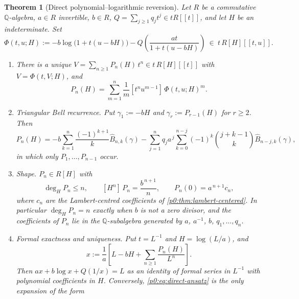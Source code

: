 \documentclass[11pt,a4paper,oneside]{book}
\theoremstyle{plain}
\newtheorem{theorem}{Theorem}[chapter]
\theoremstyle{definition}
\theoremstyle{remark}
\newcommand{\Rat}{\mathbb{Q}}
\newcommand{\Coef}[1]{[#1]\,}
\newcommand{\OB}{\widehat{B}}
\begin{document}
\begin{theorem}[Direct polynomial--logarithmic reversion]\label{p0:thm:flattening}
Let $R$ be a commutative $\Rat$-algebra, $a\in R$ invertible, $b\in R$,
$Q=\sum_{j\ge1}q_jt^j\in tR[[t]]$, and let $H$ be an indeterminate.  Set
\begin{equation}\label{p0:eq:Phi-direct}
 \Phi(t,u;H):=-b\log\bigl(1+t(u-bH)\bigr)
   -Q\!\left(\frac{at}{1+t(u-bH)}\right)
 \ \in\ t\,R[H][[t,u]].
\end{equation}
\begin{enumerate}
\item There is a unique $V=\sum_{n\ge1}P_n(H)\,t^n\in t\,R[H][[t]]$ with
      $V=\Phi(t,V;H)$, and
      \begin{equation}\label{p0:eq:P-lagrange}
       P_n(H)=\sum_{m=1}^{n}\frac1m\Coef{t^nu^{m-1}}\Phi(t,u;H)^m .
      \end{equation}
\item \emph{Triangular Bell recurrence.}  Put $\gamma_1:=-bH$ and
      $\gamma_r:=P_{r-1}(H)$ for $r\ge2$.  Then
      \begin{equation}\label{p0:eq:P-bell}
       P_n(H)=-b\sum_{k=1}^{n}\frac{(-1)^{k+1}}{k}\OB_{n,k}(\gamma)
        -\sum_{j=1}^{n}q_ja^{\,j}\sum_{k=0}^{n-j}(-1)^k\binom{j+k-1}{k}
          \OB_{n-j,k}(\gamma),
      \end{equation}
      in which only $P_1,\dots,P_{n-1}$ occur.
\item \emph{Shape.}  $P_n\in R[H]$ with
      \begin{equation}\label{p0:eq:P-shape}
       \deg_HP_n\le n,\qquad
       \Coef{H^n}P_n=\frac{b^{\,n+1}}{n},\qquad
       P_n(0)=a^{\,n+1}c_n ,
      \end{equation}
      where $c_n$ are the Lambert-centred coefficients of
      \cref{p0:thm:lambert-centered}.  In particular $\deg_HP_n=n$ exactly
      when $b$ is not a zero divisor, and the coefficients of $P_n$ lie in the
      $\Rat$-subalgebra generated by $a$, $a^{-1}$, $b$, $q_1,\dots,q_n$.
\item \emph{Formal exactness and uniqueness.}  Put $t=L^{-1}$ and
      $H=\log(L/a)$, and
      \begin{equation}\label{p0:eq:direct-ansatz}
       x:=\frac1a\left[L-bH+\sum_{n\ge1}\frac{P_n(H)}{L^{n}}\right].
      \end{equation}
      Then $ax+b\log x+Q(1/x)=L$ as an identity of formal series in $L^{-1}$
      with polynomial coefficients in $H$.  Conversely, \eqref{p0:eq:direct-ansatz}
      is the \emph{only} expansion of the form

\end{enumerate}
\end{theorem}
\end{document}
